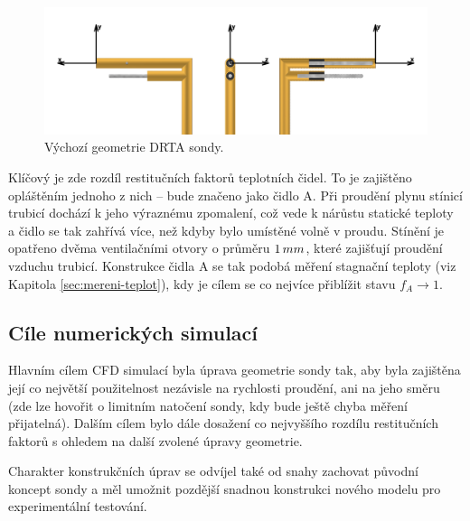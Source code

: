         \begin{figure}[ht!]
            \centering
            \includegraphics[width=\textwidth]{200_DRTA_SONDA/Vychozi_DRTA.png}
            \caption{Výchozí geometrie DRTA sondy.}
            \label{fig:vychozi-DRTA}
        \end{figure}

        Klíčový je zde rozdíl restitučních faktorů teplotních čidel. To je zajištěno opláštěním jednoho z nich – bude značeno jako čidlo A. Při proudění plynu stínicí trubicí dochází k jeho výraznému zpomalení, což vede k nárůstu statické teploty a čidlo se tak zahřívá více, než kdyby bylo umístěné volně v proudu. Stínění je opatřeno dvěma ventilačními otvory o průměru $1 \, mm$, které zajišťují proudění vzduchu trubicí. Konstrukce čidla A se tak podobá měření stagnační teploty (viz Kapitola \ref{sec:mereni-teplot}), kdy je cílem se co nejvíce přiblížit stavu $f_A \rightarrow 1$.
        \clearpage
        
    \subsection{Cíle numerických simulací}
        Hlavním cílem CFD simulací byla úprava geometrie sondy tak, aby byla zajištěna její co největší použitelnost nezávisle na rychlosti proudění, ani na jeho směru (zde lze hovořit o limitním natočení sondy, kdy bude ještě chyba měření přijatelná). Dalším cílem bylo dále dosažení co nejvyššího rozdílu restitučních faktorů s ohledem na další zvolené úpravy geometrie.

        Charakter konstrukčních úprav se odvíjel také od snahy zachovat původní koncept sondy a měl umožnit pozdější snadnou konstrukci nového modelu pro experimentální testování.